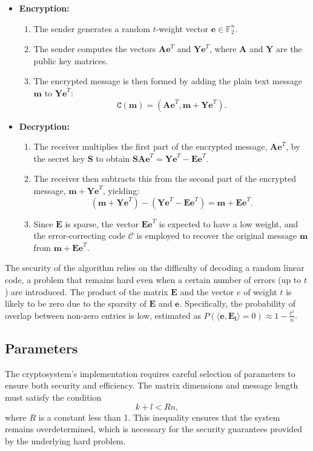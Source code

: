 \begin{itemize}
 \item \textbf{Encryption:}
    \begin{enumerate}
     \item The sender generates a random $t$-weight vector $\mathbf{e} \in \mathbb{F}_2^n$.
     \item The sender computes the vectors $\mathbf{Ae}^T$ and $\mathbf{Ye}^T$, where $\mathbf{A}$ and $\mathbf{Y}$ are the public key matrices.
     \item The encrypted message is then formed by adding the plain text message $\mathbf{m}$ to $\mathbf{Ye}^T$: $$\texttt{C}(\mathbf{m}) = (\mathbf{Ae}^T, \mathbf{m}+\mathbf{Ye}^T).$$
    \end{enumerate}

 \item \textbf{Decryption:}
    \begin{enumerate}
     \item The receiver multiplies the first part of the encrypted message, $\mathbf{Ae}^T$, by the secret key $\mathbf{S}$ to obtain $\mathbf{SAe}^T = \mathbf{Ye}^T - \mathbf{Ee}^T$.
     \item The receiver then subtracts this from the second part of the encrypted message, $\mathbf{m} + \mathbf{Ye}^T$, yielding: $$(\mathbf{m} + \mathbf{Ye}^T) - (\mathbf{Ye}^T - \mathbf{Ee}^T) = \mathbf{m} + \mathbf{Ee}^T.$$
     \item Since $\mathbf{E}$ is sparse, the vector $\mathbf{Ee}^T$ is expected to have a low weight, and the error-correcting code $\mathcal{C}$ is employed to recover the original message $\mathbf{m}$ from $\mathbf{m} + \mathbf{Ee}^T$.
    \end{enumerate}
\end{itemize}

The security of the algorithm relies on the difficulty of decoding a random linear code, a problem that remains hard even when a certain number of errors (up to $t$) are introduced. The product of the matrix $\mathbf{E}$ and the vector $e$ of weight $t$ is likely to be zero due to the sparsity of $\mathbf{E}$ and $\mathbf{e}$. Specifically, the probability of overlap between non-zero entries is low, estimated as $P(\langle \mathbf{e}, \mathbf{E_i} \rangle = 0) \approx 1 - \frac{t^2}{n}$.

\subsection{Parameters}
The cryptosystem's implementation requires careful selection of parameters to ensure both security and efficiency. The matrix dimensions and message length must satisfy the condition $$k + l < Rn,$$ where $R$ is a constant less than 1. This inequality ensures that the system remains overdetermined, which is necessary for the security guarantees provided by the underlying hard problem.

